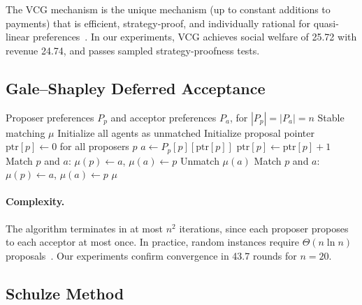 \documentclass[10pt]{article}
\begin{document}
The VCG mechanism is the unique mechanism (up to constant additions to payments) that is efficient, strategy-proof, and individually rational for quasi-linear preferences~\citep{groves1973incentives}. In our experiments, VCG achieves social welfare of 25.72 with revenue 24.74, and passes sampled strategy-proofness tests.

\subsection{Gale--Shapley Deferred Acceptance}
\label{app:gs}

\begin{algorithm}[H]
\caption{Gale--Shapley Deferred Acceptance}
\label{alg:gs}
\begin{algorithmic}[1]
\REQUIRE Proposer preferences $P_p$ and acceptor preferences $P_a$, for $|P_p| = |P_a| = n$
\ENSURE Stable matching $\mu$
\STATE Initialize all agents as unmatched
\STATE Initialize proposal pointer $\text{ptr}[p] \leftarrow 0$ for all proposers $p$
  \STATE $a \leftarrow P_p[p][\text{ptr}[p]]$ 
  \STATE $\text{ptr}[p] \leftarrow \text{ptr}[p] + 1$
    \STATE Match $p$ and $a$: $\mu(p) \leftarrow a$, $\mu(a) \leftarrow p$
    \STATE Unmatch $\mu(a)$
    \STATE Match $p$ and $a$: $\mu(p) \leftarrow a$, $\mu(a) \leftarrow p$
  \ENDIF
\ENDWHILE
\RETURN $\mu$
\end{algorithmic}
\end{algorithm}

\paragraph{Complexity.} The algorithm terminates in at most $n^2$ iterations, since each proposer proposes to each acceptor at most once. In practice, random instances require $\Theta(n \ln n)$ proposals~\citep{knuth1976mariages}. Our experiments confirm convergence in 43.7 rounds for $n=20$.

\subsection{Schulze Method}
\label{app:schulze}
\end{document}
